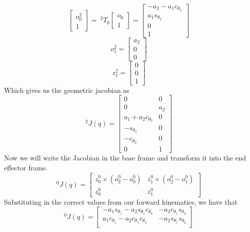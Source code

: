 \documentclass{../homework}
\begin{document}
\begin{solution}
\begin{parts}
\[     \]
     \[
       \begin{bmatrix}
         o_0^2 \\
         1
       \end{bmatrix}
       =\ ^2T_0
       \begin{bmatrix}
         o_0 \\
         1
       \end{bmatrix}
       =
       \begin{bmatrix}
         -a_2 - a_1c_{\theta_2} \\
         a_1s_{\theta_2} \\
         0 \\
         1
       \end{bmatrix}
     \]
     \[
       o_1^2 = 
       \begin{bmatrix}
         a_2 \\
         0 \\
         0
       \end{bmatrix}
     \]
     \[
       z_1^2 =  
       \begin{bmatrix}
       0 \\
       0 \\
       1
       \end{bmatrix}
     \]
     Which gives us the geometric jacobian as 
     \[
      ^2J(q) = 
      \begin{bmatrix}
        0 & 0 \\
        0 & a_2 \\
        a_1 + a_2c_{\theta_2} & 0 \\
        -s_{\theta_2} & 0 \\
        -c_{\theta_2} & 0 \\
        0 & 1
      \end{bmatrix}
     \]
     Now we will write the Jacobian in the base frame and transform it into the end effector frame.
     \[
      ^0J(q) = 
      \begin{bmatrix}
        z_0^0 \times (o^0_2 - o^0_0) & z_1^0 \times (o^0_2 - o^0_1) \\
        z_0^0 & z_1^0
      \end{bmatrix}
     \]
     Substituting in the correct values from our forward kinematics, we have that
     \[
       ^0J(q) = 
       \begin{bmatrix}
         -a_1s_{\theta_1} - a_2s_{\theta_1}c_{\theta_2} & -a_2c_{\theta_1}s_{\theta_2} \\
         a_1c_{\theta_1} - a_2c_{\theta_1}c_{\theta_2} & -a_2s_{\theta_1}s_{\theta_2} \\

\end{bmatrix}\]
\end{parts}
\end{solution}
\end{document}
